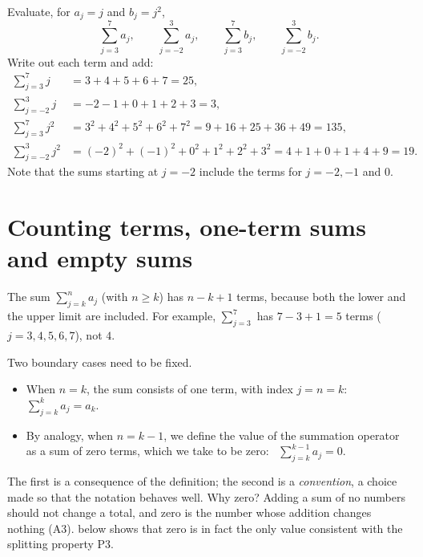 \begin{example}
Evaluate, for $a_j=j$ and $b_j=j^2$,
\[
\sum_{j=3}^{7}a_j,\qquad\sum_{j=-2}^{3}a_j,\qquad\sum_{j=3}^{7}b_j,\qquad\sum_{j=-2}^{3}b_j.
\]
\solution
Write out each term and add:
\begin{align*}
\sum_{j=3}^{7}j&=3+4+5+6+7=25,\\
\sum_{j=-2}^{3}j&=-2-1+0+1+2+3=3,\\
\sum_{j=3}^{7}j^2&=3^2+4^2+5^2+6^2+7^2=9+16+25+36+49=135,\\
\sum_{j=-2}^{3}j^2&=(-2)^2+(-1)^2+0^2+1^2+2^2+3^2=4+1+0+1+4+9=19.
\end{align*}
Note that the sums starting at $j=-2$ include the terms for $j=-2,-1$ and $0$.
\end{example}

\section{Counting terms, one-term sums and empty sums}\label{sec:sigma-conventions}

\begin{core}
The sum $\sum_{j=k}^n a_j$ (with $n\ge k$) has $n-k+1$ terms, because both the lower and the upper limit are
included. For example, $\sum_{j=3}^7$ has $7-3+1=5$ terms ($j=3,4,5,6,7$), not $4$.
\end{core}

Two boundary cases need to be fixed.

\begin{definition}
\begin{itemize}
  \item When $n=k$, the sum consists of one term, with index $j=n=k$: \ $\displaystyle\sum_{j=k}^{k}a_j=a_k$.
  \item By analogy, when $n=k-1$, we define the value of the summation operator as a sum of zero terms, which we
  take to be zero: \ $\displaystyle\sum_{j=k}^{k-1}a_j=0$.
\end{itemize}
\end{definition}

The first is a consequence of the definition; the second is a \emph{convention}, a choice made so that the notation
behaves well. Why zero? Adding a sum of no numbers should not change a total, and zero is the number whose addition
changes nothing (A3).  below shows that zero is in fact the only value consistent with the
splitting property P3.

